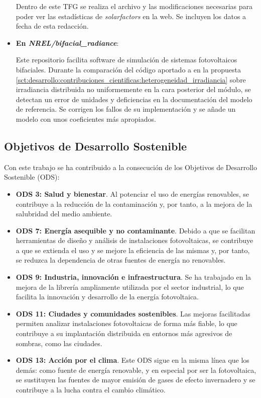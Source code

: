 \begin{itemize}
          Dentro de este TFG se realiza el archivo y las modificaciones necesarias para poder ver las estadísticas de \textit{solarfactors} en la web. Se incluyen los datos a fecha de esta redacción.

    \item \textbf{En \textit{NREL/bifacial\_radiance}}:
    
          Este \gls{repositorio} facilita \gls{software} de simulación de sistemas fotovoltaicos bifaciales. Durante la comparación del código aportado a \pvlibpy{} en la propuesta \ref{sct:desarrollo:contribuciones_cientificas:heterogeneidad_irradiancia} sobre irradiancia distribuida no uniformemente en la cara posterior del \gls{módulo}, se detectan un error de unidades y deficiencias en la documentación del modelo de referencia. Se corrigen los fallos de su implementación y se añade un modelo con unos coeficientes más apropiados.

\end{itemize}


\subsection{Objetivos de Desarrollo Sostenible} \label{sssct:impacto:ods}

Con este trabajo se ha contribuido a la consecución de los Objetivos de Desarrollo Sostenible (ODS):

\begin{itemize}
    \item \textbf{ODS 3: Salud y bienestar}. Al potenciar el uso de energías renovables, se contribuye a la reducción de la contaminación y, por tanto, a la mejora de la salubridad del medio ambiente.
    \item \textbf{ODS 7: Energía asequible y no contaminante}. Debido a que se facilitan herramientas de diseño y análisis de instalaciones fotovoltaicas, se contribuye a que se extienda el uso y se mejore la eficiencia de las mismas y, por tanto, se reduzca la dependencia de otras fuentes de energía no renovables.
    \item \textbf{ODS 9: Industria, innovación e infraestructura}. Se ha trabajado en la mejora de la librería \pvlibpy ampliamente utilizada por el sector industrial, lo que facilita la innovación y desarrollo de la energía fotovoltaica.
    \item \textbf{ODS 11: Ciudades y comunidades sostenibles}. Las mejoras facilitadas permiten analizar instalaciones fotovoltaicas de forma más fiable, lo que contribuye a su implantación distribuida en entornos más agresivos de sombras, como las ciudades.
    \item \textbf{ODS 13: Acción por el clima}. Este ODS sigue en la misma línea que los demás: como fuente de energía renovable, y en especial por ser la fotovoltaica, se sustituyen las fuentes de mayor emisión de gases de efecto invernadero y se contribuye a la lucha contra el cambio climático.
\end{itemize}



